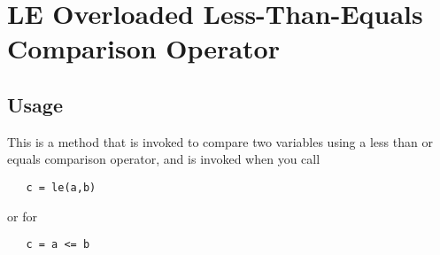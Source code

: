 \section{LE Overloaded Less-Than-Equals Comparison Operator}

\subsection{Usage}

This is a method that is invoked to compare two variables using a
less than or equals comparison operator, and is invoked when you call
\begin{verbatim}
   c = le(a,b)
\end{verbatim}
or for 
\begin{verbatim}
   c = a <= b
\end{verbatim}
